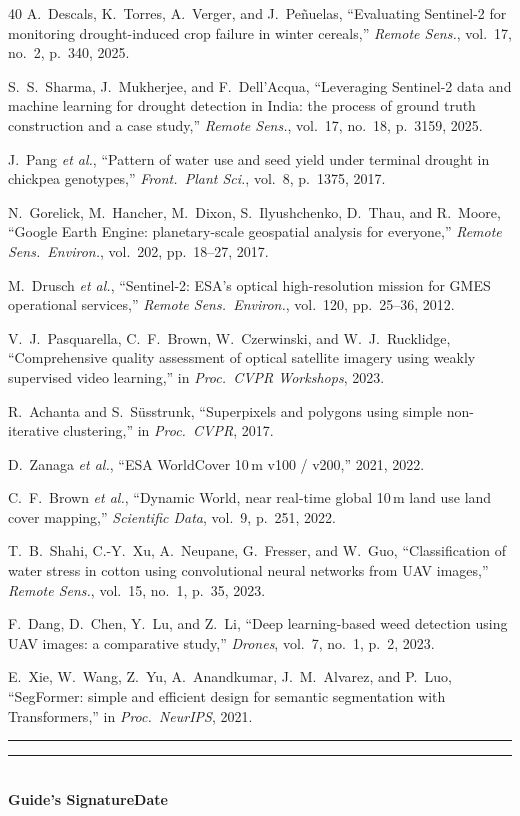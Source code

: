 \documentclass[11pt,a4paper,oneside]{article}
\begin{document}
\begin{thebibliography}{40}
 A.~Descals, K.~Torres, A.~Verger, and J.~Pe\~{n}uelas, ``Evaluating Sentinel-2 for monitoring drought-induced crop failure in winter cereals,'' \textit{Remote Sens.}, vol.~17, no.~2, p.~340, 2025.

 S.~S.~Sharma, J.~Mukherjee, and F.~Dell'Acqua, ``Leveraging Sentinel-2 data and machine learning for drought detection in India: the process of ground truth construction and a case study,'' \textit{Remote Sens.}, vol.~17, no.~18, p.~3159, 2025.

 J.~Pang \textit{et al.}, ``Pattern of water use and seed yield under terminal drought in chickpea genotypes,'' \textit{Front.\ Plant Sci.}, vol.~8, p.~1375, 2017.

 N.~Gorelick, M.~Hancher, M.~Dixon, S.~Ilyushchenko, D.~Thau, and R.~Moore, ``Google Earth Engine: planetary-scale geospatial analysis for everyone,'' \textit{Remote Sens.\ Environ.}, vol.~202, pp.~18--27, 2017.

 M.~Drusch \textit{et al.}, ``Sentinel-2: ESA's optical high-resolution mission for GMES operational services,'' \textit{Remote Sens.\ Environ.}, vol.~120, pp.~25--36, 2012.

 V.~J.~Pasquarella, C.~F.~Brown, W.~Czerwinski, and W.~J.~Rucklidge, ``Comprehensive quality assessment of optical satellite imagery using weakly supervised video learning,'' in \textit{Proc.\ CVPR Workshops}, 2023.

 R.~Achanta and S.~S\"{u}sstrunk, ``Superpixels and polygons using simple non-iterative clustering,'' in \textit{Proc.\ CVPR}, 2017.

 D.~Zanaga \textit{et al.}, ``ESA WorldCover 10\,m v100 / v200,'' 2021, 2022.

 C.~F.~Brown \textit{et al.}, ``Dynamic World, near real-time global 10\,m land use land cover mapping,'' \textit{Scientific Data}, vol.~9, p.~251, 2022.

 T.~B.~Shahi, C.-Y.~Xu, A.~Neupane, G.~Fresser, and W.~Guo, ``Classification of water stress in cotton using convolutional neural networks from UAV images,'' \textit{Remote Sens.}, vol.~15, no.~1, p.~35, 2023.

 F.~Dang, D.~Chen, Y.~Lu, and Z.~Li, ``Deep learning-based weed detection using UAV images: a comparative study,'' \textit{Drones}, vol.~7, no.~1, p.~2, 2023.

 E.~Xie, W.~Wang, Z.~Yu, A.~Anandkumar, J.~M.~Alvarez, and P.~Luo, ``SegFormer: simple and efficient design for semantic segmentation with Transformers,'' in \textit{Proc.\ NeurIPS}, 2021.

\end{thebibliography}
\endgroup

\vspace{6pt}
\noindent\rule{0.38\textwidth}{0.4pt}\hfill\rule{0.28\textwidth}{0.4pt}\\[2pt]
\noindent\textbf{Guide's Signature}\hfill\textbf{Date}
\end{document}
